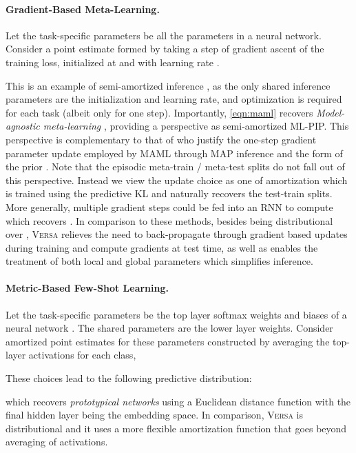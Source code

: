\documentclass{article}
\newcommand{\Versa}{\textsc{Versa}}
\begin{document}
\paragraph{Gradient-Based Meta-Learning.}
Let the task-specific parameters  be all the parameters in a neural network. Consider a point estimate formed by taking a step of gradient ascent of the training loss, initialized at  and with learning rate .

This is an example of semi-amortized inference \citep{kim2018semi}, as the only shared inference parameters are the initialization and learning rate, and optimization is required for each task (albeit only for one step). Importantly, \cref{eqn:maml} recovers \textit{Model-agnostic meta-learning} \citep{finn2017model}, providing a perspective as semi-amortized ML-PIP. This perspective is complementary to that of \cite{grant2018recasting} who justify the one-step gradient parameter update employed by MAML through MAP inference and the form of the prior . Note that the episodic meta-train / meta-test splits do not fall out of this perspective. Instead we view the update choice as one of amortization which is trained using the predictive KL and naturally recovers the test-train splits. More generally, multiple gradient steps could be fed into an RNN to compute  which recovers \citet{ravi2016optimization}. In comparison to these methods, besides being distributional over , \Versa{} relieves the need to back-propagate through gradient based updates during training and compute gradients at test time, as well as enables the treatment of both local and global parameters which simplifies inference. 

\paragraph{Metric-Based Few-Shot Learning.} 
Let the task-specific parameters be the top layer softmax weights and biases of a neural network . The shared parameters are the lower layer weights. Consider amortized point estimates for these parameters constructed by averaging the top-layer activations for each class, 

These choices lead to the following predictive distribution:

which recovers \textit{prototypical networks} \citep{snell2017prototypical} using a Euclidean distance function  with the final hidden layer being the embedding space. In comparison, \Versa{} is distributional and it uses a more flexible amortization function that goes beyond  averaging of activations.
\end{document}
